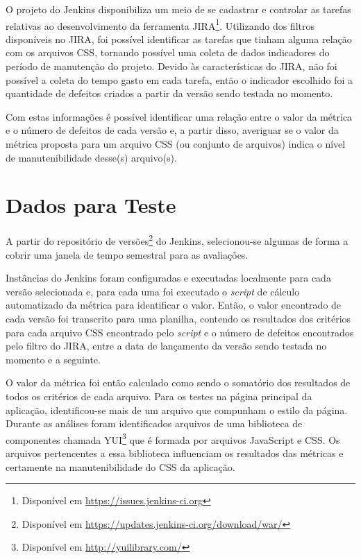 


O projeto do Jenkins disponibiliza um meio de se cadastrar e controlar as tarefas relativas ao desenvolvimento da ferramenta JIRA\footnote{Disponível em \url{https://issues.jenkins-ci.org}}. Utilizando dos filtros disponíveis no JIRA, foi possível identificar as tarefas que tinham alguma relação com os arquivos CSS, tornando possível uma coleta de dados indicadores do período de manutenção do projeto. Devido às características do JIRA, não foi possível a coleta do tempo gasto em cada tarefa, então o indicador escolhido foi a quantidade de defeitos criados a partir da versão sendo testada no momento. %

Com estas informações é possível identificar uma relação entre o valor da métrica e o número de defeitos de cada versão e, a partir disso, averiguar se o valor da métrica proposta para um arquivo CSS (ou conjunto de arquivos) indica o nível de manutenibilidade desse(s) arquivo(s).

\section{Dados para Teste}

A partir do repositório de versões\footnote{Disponível em \url{https://updates.jenkins-ci.org/download/war/}} do Jenkins, selecionou-se algumas de forma a cobrir uma janela de tempo semestral para as avaliações.

Instâncias do Jenkins foram configuradas e executadas localmente para cada versão selecionada e, para cada uma foi executado o \textit{script} de cálculo automatizado da métrica para identificar o valor. Então, o valor encontrado de cada versão foi transcrito para uma planilha, contendo os resultados dos critérios para cada arquivo CSS encontrado pelo \textit{script} e o número de defeitos encontrados pelo filtro do JIRA, entre a data de lançamento da versão sendo testada no momento e a seguinte. %


O valor da métrica foi então calculado como sendo o somatório dos resultados de todos os critérios de cada arquivo. %
Para os testes na página principal da aplicação, identificou-se mais de um arquivo que compunham o estilo da página. Durante as análises foram identificados arquivos de uma biblioteca de componentes chamada YUI\footnote{Disponível em \url{http://yuilibrary.com/}} que é formada por arquivos JavaScript e CSS. Os arquivos pertencentes a essa biblioteca influenciam os resultados das métricas e certamente na manutenibilidade do CSS da aplicação.

